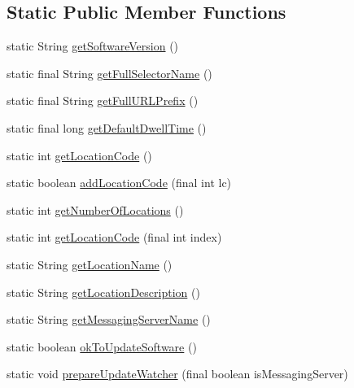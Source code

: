 \subsection*{Static Public Member Functions}
\begin{DoxyCompactItemize}
\item 
static String \hyperlink{classgov_1_1fnal_1_1ppd_1_1dd_1_1GlobalVariables_a7ad73efb183068d334b1977c3ef799cc}{get\-Software\-Version} ()
\item 
static final String \hyperlink{classgov_1_1fnal_1_1ppd_1_1dd_1_1GlobalVariables_ae88e0336fe6e23f56d14aee1882b88d4}{get\-Full\-Selector\-Name} ()
\item 
static final String \hyperlink{classgov_1_1fnal_1_1ppd_1_1dd_1_1GlobalVariables_ab7639ebfcc296b374593079a06026c65}{get\-Full\-U\-R\-L\-Prefix} ()
\item 
static final long \hyperlink{classgov_1_1fnal_1_1ppd_1_1dd_1_1GlobalVariables_aedef0ba63ced272b0ec2f17504a2cf96}{get\-Default\-Dwell\-Time} ()
\item 
static int \hyperlink{classgov_1_1fnal_1_1ppd_1_1dd_1_1GlobalVariables_a9628de1e1de48d98cda0cc110f0c1b92}{get\-Location\-Code} ()
\item 
static boolean \hyperlink{classgov_1_1fnal_1_1ppd_1_1dd_1_1GlobalVariables_a17d26da1f2cffe32553babb71545319e}{add\-Location\-Code} (final int lc)
\item 
static int \hyperlink{classgov_1_1fnal_1_1ppd_1_1dd_1_1GlobalVariables_af9305013fcd1f485a77e6448b5b14ebb}{get\-Number\-Of\-Locations} ()
\item 
static int \hyperlink{classgov_1_1fnal_1_1ppd_1_1dd_1_1GlobalVariables_afa655a7918baebe5606c9a936f25a2b5}{get\-Location\-Code} (final int index)
\item 
static String \hyperlink{classgov_1_1fnal_1_1ppd_1_1dd_1_1GlobalVariables_a2b6eb3cd0162c4ef8a7476afc3180602}{get\-Location\-Name} ()
\item 
static String \hyperlink{classgov_1_1fnal_1_1ppd_1_1dd_1_1GlobalVariables_a0dd398dcbd954f1d5c9060a40567cde8}{get\-Location\-Description} ()
\item 
static String \hyperlink{classgov_1_1fnal_1_1ppd_1_1dd_1_1GlobalVariables_a031a776923237b72e7cfa1e2804097ad}{get\-Messaging\-Server\-Name} ()
\item 
static boolean \hyperlink{classgov_1_1fnal_1_1ppd_1_1dd_1_1GlobalVariables_a3d2db19203c4e972d23055ac6ca6d728}{ok\-To\-Update\-Software} ()
\item 
static void \hyperlink{classgov_1_1fnal_1_1ppd_1_1dd_1_1GlobalVariables_a7a261637e9a06bba925ba4901ecf4479}{prepare\-Update\-Watcher} (final boolean is\-Messaging\-Server)

\end{DoxyCompactItemize}
